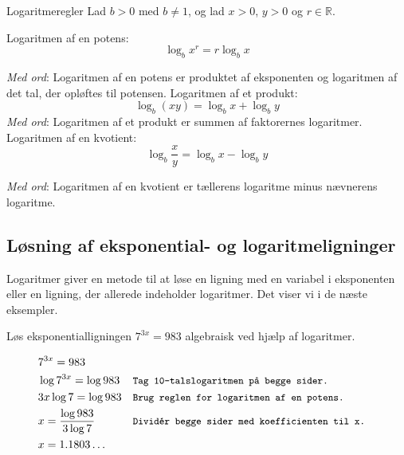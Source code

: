 \begin{custombox}{Logaritmeregler}
\setlength{\leftskip}{1cm}  %
\setlength{\rightskip}{1cm} %
Lad $b>0$ med $b\neq 1$, og lad $x>0$, $y>0$ og $r\in\mathbb{R}$.

Logaritmen af en potens:
$$
\log _b x^r=r \log _b x
$$

\textit{Med ord}: Logaritmen af en potens er produktet af eksponenten og logaritmen af det tal, der opløftes til potensen.
\vspace{0.5cm}
Logaritmen af et produkt:
$$
\log _b(x y)=\log _b x+\log _b y
$$
\textit{Med ord}: Logaritmen af et produkt er summen af faktorernes logaritmer.
\vspace{0.5cm}
Logaritmen af en kvotient:
$$
\log _b \frac{x}{y}=\log _b x-\log _b y
$$

\textit{Med ord}: Logaritmen af en kvotient er tællerens logaritme minus nævnerens logaritme.

\setlength{\leftskip}{0cm}  %
\setlength{\rightskip}{0cm} %

\end{custombox}

\subsection*{Løsning af eksponential- og logaritmeligninger}
Logaritmer giver en metode til at løse en ligning med en variabel i eksponenten eller en ligning, der allerede indeholder logaritmer. Det viser vi i de næste eksempler.

\begin{example} Løs eksponentialligningen $7^{3 x}=983$ algebraisk ved hjælp af logaritmer.

\begin{solution}
\begin{align*}
& 7^{3x} = 983  \\
& \log 7^{3x} = \log 983 && \texttt{\small Tag 10-talslogaritmen på begge sider.} \\
& 3x \log 7 = \log 983 && \texttt{\small Brug reglen for logaritmen af en potens.} \\
& x = \frac{\log 983}{3 \log 7} && \texttt{\small Dividér begge sider med koefficienten til x.}\\
& x = 1.1803 \ldots   
\end{align*}


\end{solution}
    
\end{example}

